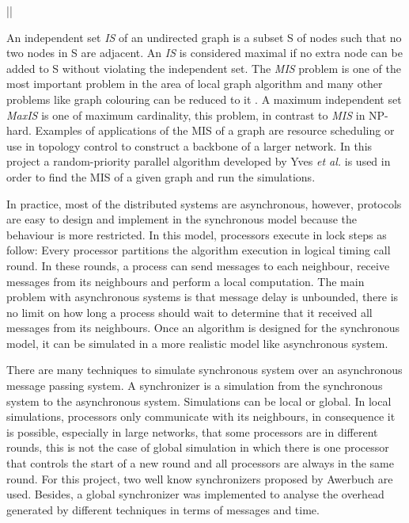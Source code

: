 ||\documentclass[11pt]{article} %
\theoremstyle{plain}
\theoremstyle{definition}
\begin{document}
An independent set \textit{IS} of an undirected graph is a subset S of nodes such that no two nodes in S are adjacent. An \textit{IS} is considered maximal if no extra node can be added to S without violating the independent set. The \textit{MIS} problem is one of the most important problem in the area of local graph algorithm and many other problems like graph colouring can be reduced to it \cite{panconesi1992improved}. A maximum independent set \textit{MaxIS} is one of maximum cardinality, this problem, in contrast to \textit{MIS} in NP-hard. Examples of applications of the MIS of a graph are resource scheduling or use in topology control to construct a backbone of a larger network\cite{basagni2001finding}. In this project a random-priority parallel algorithm developed by Yves \textit{et al.} \cite{yves2009optimal} is used in order to find the MIS of a given graph and run the simulations.


In practice, most of the distributed systems are asynchronous, however, protocols are easy to design and implement in the synchronous model because the behaviour is more restricted. In this model, processors execute in lock steps as follow: Every processor partitions the algorithm execution in logical timing call round. In these rounds, a process can send messages to each neighbour, receive messages from its neighbours and perform a local computation. The main problem with asynchronous systems is that message delay is unbounded, there is no limit on how long a process should wait to determine that it received all messages from its neighbours. Once an algorithm is designed for the synchronous model, it can be simulated in a more realistic model like asynchronous system. 



There are many techniques to simulate synchronous system over an asynchronous message passing system. A synchronizer is a simulation from the synchronous system to the asynchronous system. Simulations can be local or global. In local simulations, processors only communicate with its neighbours, in consequence it is possible, especially in large networks, that some processors are in different rounds, this is not the case of global simulation in which there is one processor that controls the start of a new round and all processors are always in the same round. For this project, two well know synchronizers proposed by Awerbuch \cite{awerbuch1985complexity} are used. Besides, a global synchronizer was implemented to analyse the overhead generated by different techniques in terms of messages and time. 
\end{document}
